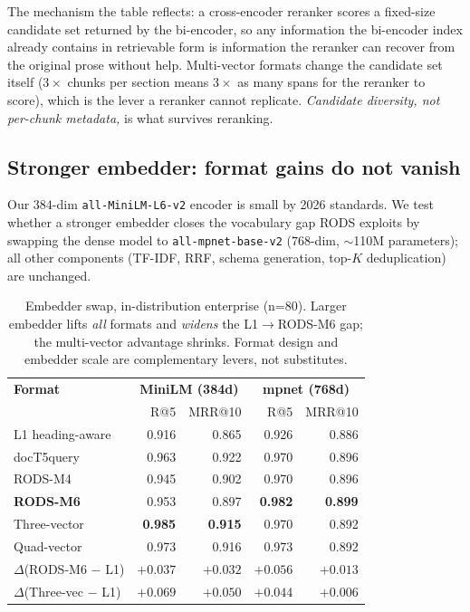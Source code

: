 \documentclass[11pt]{article}
\begin{document}
The mechanism the table reflects: a cross-encoder reranker scores a
fixed-size candidate set returned by the bi-encoder, so any
information the bi-encoder index already contains in retrievable form
is information the reranker can recover from the original prose
without help. Multi-vector formats change the candidate set itself
($3{\times}$ chunks per section means $3{\times}$ as many spans for
the reranker to score), which is the lever a reranker cannot
replicate. \emph{Candidate diversity, not per-chunk metadata,} is
what survives reranking.

\subsection{Stronger embedder: format gains do not vanish}
\label{sec:mpnet}

Our $384$-dim \texttt{all-MiniLM-L6-v2} encoder is small by 2026
standards. We test whether a stronger embedder closes the vocabulary
gap RODS exploits by swapping the dense model to
\texttt{all-mpnet-base-v2} ($768$-dim, $\sim$110M parameters);
all other components (TF-IDF, RRF, schema generation,
top-$K$ deduplication) are unchanged.

\begin{table}[H]
\centering
\caption{Embedder swap, in-distribution enterprise (n=80). Larger
  embedder lifts \emph{all} formats and \emph{widens} the L1$\to$RODS-M6
  gap; the multi-vector advantage shrinks. Format design and embedder
  scale are complementary levers, not substitutes.}
\label{tab:mpnet}
\small
\begin{tabular}{lrrrr}
\toprule
\textbf{Format} & \multicolumn{2}{c}{\textbf{MiniLM (384d)}} & \multicolumn{2}{c}{\textbf{mpnet (768d)}} \\
                & R@5 & MRR@10 & R@5 & MRR@10 \\
\midrule
L1 heading-aware  & 0.916 & 0.865 & 0.926 & 0.886 \\
docT5query        & 0.963 & 0.922 & 0.970 & 0.896 \\
RODS-M4           & 0.945 & 0.902 & 0.970 & 0.896 \\
\rowcolor{bestcolor!12}
\textbf{RODS-M6} & 0.953 & 0.897 & \textbf{0.982} & \textbf{0.899} \\
Three-vector      & \textbf{0.985} & \textbf{0.915} & 0.970 & 0.892 \\
Quad-vector       & 0.973 & 0.916 & 0.973 & 0.892 \\
\midrule
$\Delta$(RODS-M6 $-$ L1)        & $+0.037$ & $+0.032$ & $+0.056$ & $+0.013$ \\
$\Delta$(Three-vec $-$ L1)      & $+0.069$ & $+0.050$ & $+0.044$ & $+0.006$ \\
\bottomrule
\end{tabular}
\end{table}
\end{document}
